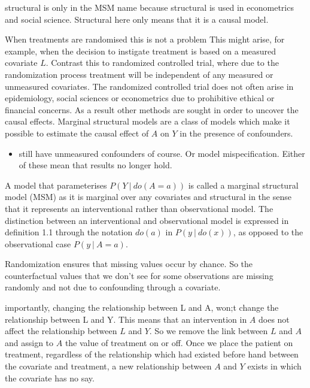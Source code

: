 \documentclass[11pt]{article}
\providecommand{\tightlist}{%
      \setlength{\itemsep}{0pt}\setlength{\parskip}{0pt}}
\begin{document}
structural is only in the MSM name because structural is used in
econometrics and social science. Structural here only means that it is a
causal model.

When treatments are randomised this is not a problem This might arise,
for example, when the decision to instigate treatment is based on a
measured covariate \(L\). Contrast this to randomized controlled trial,
where due to the randomization process treatment will be independent of
any measured or unmeasured covariates. The randomized controlled trial
does not often arise in epidemiology, social sciences or econometrics
due to prohibitive ethical or financial concerns. As a result other
methods are sought in order to uncover the causal effects. Marginal
structural models are a class of models which make it possible to
estimate the causal effect of \(A\) on \(Y\) in the presence of
confounders.

\begin{itemize}
\tightlist
\item
  still have unmeasured confounders of course. Or model mispecification.
  Either of these mean that results no longer hold.
\end{itemize}

A model that parameterises \(P(Y\ |\ do(A=a))\) is called a marginal
structural model (MSM) as it is marginal over any covariates and
structural in the sense that it represents an interventional rather than
observational model. The distinction between an interventional and
observational model is expressed in definition 1.1 through the notation
\(do(a)\) in \(P(y\ |\ do(x))\), as opposed to the observational case
\(P(y\ |\ A=a)\).

Randomization ensures that missing values occur by chance. So the
counterfactual values that we don't see for some observations are
missing randomly and not due to confounding through a covariate.

    importantly, changing the relationship between L and A, won;t change the
relationship between L and Y. This means that an intervention in \(A\)
does not affect the relationship between \(L\) and \(Y\). So we remove
the link between \(L\) and \(A\) and assign to \(A\) the value of
treatment on or off. Once we place the patient on treatment, regardless
of the relationship which had existed before hand between the covariate
and treatment, a new relationship between \(A\) and \(Y\) exists in
which the covariate has no say.
\end{document}
